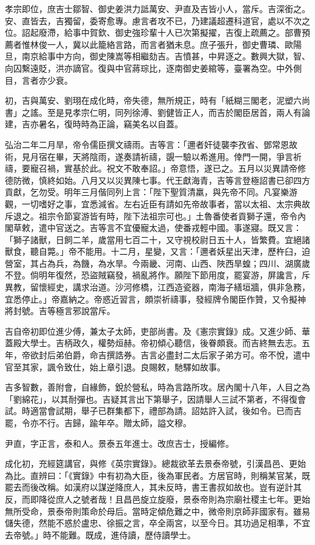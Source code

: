 \begin{pinyinscope}
孝宗即位，庶吉士鄒智、御史姜洪力詆萬安、尹直及吉皆小人，當斥。吉深銜之。安、直皆去，吉獨留，委寄愈專。慮言者攻不已，乃建議超遷科道官，處以不次之位。詔起廢滯，給事中賀欽、御史強珍輩十人已次第擬擢，吉復上疏薦之。部曹預薦者惟林俊一人，冀以此籠絡言路，而言者猶未息。庶子張升，御史曹璘、歐陽旦，南京給事中方向，御史陳嵩等相繼劾吉。吉憤甚，中昇逐之。數興大獄，智、向囚繫遠貶，洪亦謫官。復與中官蔣琮比，逐南御史姜綰等，臺署為空。中外側目，言者亦少衰。

初，吉與萬安、劉珝在成化時，帝失德，無所規正，時有「紙糊三閣老，泥塑六尚書」之謠。至是見孝宗仁明，同列徐溥、劉健皆正人，而吉於閣臣居首，兩人有論建，吉亦暑名，復時時為正論，竊美名以自蓋。

弘治二年二月旱，帝令儒臣撰文禱雨。吉等言：「邇者奸徒襲李孜省、鄧常恩故術，見月宿在畢，天將陰雨，遂奏請祈禱，覬一驗以希進用。倖門一開，爭言祈禱，要寵召禍，實基於此。祝文不敢奉詔。」帝意悟，遂已之。五月以災異請帝修德防微，慎終如始。八月又以災異陳七事。代王獻海青，吉等言登極詔書已卻四方貢獻，乞勿受。明年三月偕同列上言：「陛下聖質清羸，與先帝不同。凡宴樂游觀，一切嗜好之事，宜悉減省。左右近臣有請如先帝故事者，當以太祖、太宗典故斥退之。祖宗令節宴游皆有時，陛下法祖宗可也。」土魯番使者貢獅子還，帝令內閣草敕，遣中官送之。吉等言不宜優寵太過，使番戎輕中國。事遂寢。既又言：「獅子諸獸，日飼二羊，歲當用七百二十，又守視校尉日五十人，皆繁費。宜絕諸獸食，聽自斃。」帝不能用。十二月，星變，又言：「邇者妖星出天津，歷杵臼，迫營室，其占為兵，為饑，為水旱。今兩畿、河南、山西、陜西旱蝗；四川、湖廣歲不登。倘明年復然，恐盜賊竊發，禍亂將作。願陛下節用度，罷宴游，屏讒言，斥異教，留懷經史，講求治道。沙河修橋，江西造瓷器，南海子繕垣牆，俱非急務，宜悉停止。」帝嘉納之。帝惑近習言，頗崇祈禱事，發經牌令閣臣作贊，又令擬神將封號。吉等極言邪說當斥。

吉自帝初即位進少傅，兼太子太師，吏部尚書。及《憲宗實錄》成。又進少師、華蓋殿大學士。吉柄政久，權勢烜赫。帝初傾心聽信，後眷頗衰。而吉終無去志。五年，帝欲封后弟伯爵，命吉撰誥券。吉言必盡封二太后家子弟方可。帝不悅，遣中官至其家，諷令致仕，始上章引退。良賜敕，馳驛如故事。

吉多智數，善附會，自緣飾，銳於營私，時為言路所攻。居內閣十八年，人目之為「劉綿花」，以其耐彈也。吉疑其言出下第舉子，因請舉人三試不第者，不得復會試。時適當會試期，舉子已群集都下，禮部為請。詔姑許入試，後如令。已而吉罷，令亦不行。吉歸，踰年卒。贈太師，謚文穆。

尹直，字正言，泰和人。景泰五年進士。改庶吉士，授編修。

成化初，充經筵講官，與修《英宗實錄》。總裁欲革去景泰帝號，引漢昌邑、更始為比。直辨曰：「《實錄》中有初為大臣，後為軍民者。方居官時，則稱某官某，既罷去而後改稱。如漢府以謀逆降庶人，其未反時，書王書叔如故也。豈有逆計其反，而即降從庶人之號者哉！且昌邑旋立旋廢，景泰帝則為宗廟社稷主七年。更始無所受命，景泰帝則策命於母后。當時定傾危難之中，微帝則京師非國家有。雖易儲失德，然能不惑於盧忠、徐振之言，卒全兩宮，以至今日。其功過足相準，不宜去帝號。」時不能難。既成，進侍讀，歷侍讀學士。


\end{pinyinscope}
